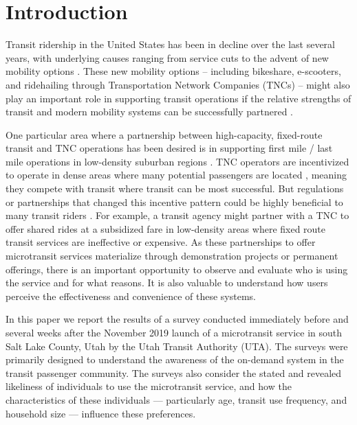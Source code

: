 \documentclass[smartcities,article,submit,moreauthors,pdftex]{Definitions/mdpi}
\begin{document}

\section{Introduction}

Transit ridership in the United States has been in decline over the last several years, with underlying causes ranging from service cuts to the advent of new mobility options \citep{Graehler2019, Mallett2018}. These new mobility options -- including bikeshare, e-scooters, and ridehailing through Transportation Network Companies (TNCs) -- might also play an important role in supporting transit operations if the relative strengths of transit and modern mobility systems can be successfully partnered \citep{Shaheen2016, OOSTENDORP201872, ShivThesis}.

One particular area where a partnership between high-capacity, fixed-route transit and TNC operations has been desired is in supporting first mile / last mile operations in low-density suburban regions \citep{Shaheen2016, alonso2018, Kang2020}. TNC operators are incentivized to operate in dense areas where many potential passengers are located \citep{Wong2020}, meaning they compete with transit where transit can be most successful. But regulations or partnerships that changed this incentive pattern could be highly beneficial to many transit riders \citep{Ronald2017, Deakin2010}. For example, a transit agency might partner with a TNC to offer shared rides at a subsidized fare in low-density areas where fixed route transit services are ineffective or expensive. As these partnerships to offer microtransit services materialize through demonstration projects or permanent offerings, there is an important opportunity to observe and evaluate who is using the service and for what reasons. It is also valuable to understand how users perceive the effectiveness and convenience of these systems.

In this paper we report the results of a survey conducted immediately before and several weeks after the November 2019 launch of a microtransit service in south Salt Lake County, Utah by the Utah Transit Authority (UTA). The surveys were primarily designed to understand the awareness of the on-demand system in the transit passenger community. The surveys also consider the stated and revealed likeliness of individuals to use the microtransit service, and how the characteristics of these individuals --- particularly age, transit use frequency, and household size --- influence these preferences.
\end{document}
